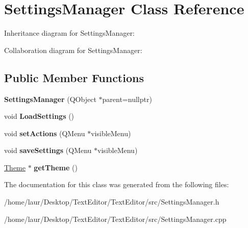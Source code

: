 \hypertarget{class_settings_manager}{}\section{Settings\+Manager Class Reference}
\label{class_settings_manager}


Inheritance diagram for Settings\+Manager\+:


Collaboration diagram for Settings\+Manager\+:
\subsection*{Public Member Functions}
\begin{DoxyCompactItemize}
\item 
\mbox{\label{class_settings_manager_a363266df196e35be711bf9ad421839ed}} 
{\bfseries Settings\+Manager} (Q\+Object $\ast$parent=nullptr)
\item 
\mbox{\label{class_settings_manager_af769cba13b55e0809ff729bf3885c258}} 
void {\bfseries Load\+Settings} ()
\item 
\mbox{\label{class_settings_manager_a9162ca9c8f56576b14c839e69c927d06}} 
void {\bfseries set\+Actions} (Q\+Menu $\ast$visible\+Menu)
\item 
\mbox{\label{class_settings_manager_a6a373bd83f7e7a1cae1e1a4c656db2c2}} 
void {\bfseries save\+Settings} (Q\+Menu $\ast$visible\+Menu)
\item 
\mbox{\label{class_settings_manager_a95bc89dafee74302026b4f3a3d07841c}} 
\hyperlink{class_theme}{Theme} $\ast$ {\bfseries get\+Theme} ()
\end{DoxyCompactItemize}


The documentation for this class was generated from the following files\+:\begin{DoxyCompactItemize}
\item 
/home/laur/\+Desktop/\+Text\+Editor/\+Text\+Editor/src/Settings\+Manager.\+h\item 
/home/laur/\+Desktop/\+Text\+Editor/\+Text\+Editor/src/Settings\+Manager.\+cpp\end{DoxyCompactItemize}

